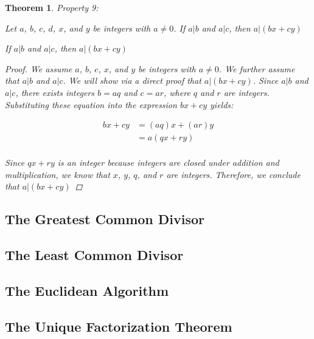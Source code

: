 \documentclass{book}
\newtheorem{theorem}{Theorem}[section]
\theoremstyle{definition}
\theoremstyle{remark}
\begin{document}
\newpage
\begin{theorem}
Property 9: \\ 
    \begin{tcolorbox}
        Let $a$, $b$, $c$, $d$, $x$, and $y$ be integers with $a \neq 0$. If $a | b$ and $a | c$, then $a | (bx + cy)$
        \begin{center}
            If $a | b$ and $a | c$, then $a |(bx + cy)$
        \end{center}
    \end{tcolorbox}

    \begin{proof}
        We assume $a$, $b$, $c$, $x$, and $y$ be integers with $a \neq 0$. We further assume that $a | b$ and $a | c$. We will show via a direct proof that $a | (bx + cy)$. Since $a | b$ and $a | c$, there exists integers $b = aq$ and $c = ar$, where $q$ and $r$ are integers. Substituting these equation into the expression $bx + cy$ yields:

            \begin{align*}
            	bx + cy & = (aq)x + (ar)y \\	
            	    & = a(qx + ry) \\	
            \end{align*}

        Since $qx + ry$ is an integer because integers are closed under addition  and multiplication, we know that $x$, $y$, $q$, and $r$ are integers. Therefore, we conclude that $a | (bx + cy)$
    \end{proof}
\end{theorem}














\newpage
\subsection{The Greatest Common Divisor}
\subsection{The Least Common Divisor}
\subsection{The Euclidean Algorithm}
\subsection{The Unique Factorization Theorem}
\end{document}

